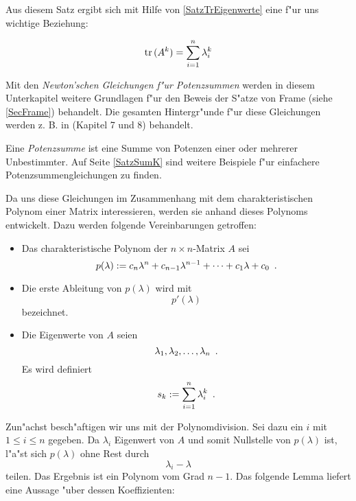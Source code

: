 Aus diesem Satz ergibt sich mit Hilfe von \ref{SatzTrEigenwerte}
eine f"ur uns wichtige Beziehung:
\begin{korollar}
\label{SatzTraceLambda}
    \[ \mbox{\rm tr} \,(A^k) = \sum_{i=1}^n \lambda_i^k \]
\end{korollar}


\label{SecNewtonPotenz}

Mit den {\em Newton'schen Gleichungen f"ur Potenzsummen} werden in diesem
Unterkapitel weitere Grundlagen f"ur den Beweis der S"atze von Frame
(siehe \ref{SecFrame}) behandelt. Die gesamten Hintergr"unde f"ur diese
Gleichungen werden z. B. in \cite{Haup52} (Kapitel 7 und 8) behandelt.

Eine {\em Potenzsumme} ist eine Summe von Potenzen einer oder mehrerer
Unbestimmter. Auf Seite \ref{SatzSumK} sind weitere Beispiele f"ur 
einfachere Potenzsummengleichungen zu finden.

Da uns diese Gleichungen im Zusammenhang mit dem charakteristischen
Polynom einer Matrix interessieren, werden sie anhand dieses Polynoms
entwickelt. Dazu werden folgende Vereinbarungen getroffen:
\begin{itemize}
\item
      Das charakteristische Polynom der $n \times n$-Matrix $A$ sei
      \[
         p(\lambda) := c_n \lambda^n + c_{n-1} \lambda^{n-1} + \cdots
                       + c_1 \lambda + c_0 \mbox{\hspace{0.5em}.} 
      \]
\item
      Die erste Ableitung von $p(\lambda)$ wird mit \[ p'(\lambda) \]
      bezeichnet.
\item Die Eigenwerte von $A$ seien
      \[ \lambda_1, \lambda_2, \ldots, \lambda_n \mbox{\hspace{0.5em}.} \]
      Es wird definiert
      \[ s_k := \sum_{i=1}^n \lambda_i^k \mbox{\hspace{0.5em}.} \]
\end{itemize}

Zun"achst besch"aftigen wir uns mit der 
Polynomdivision. 
Sei dazu ein $i$
mit $ 1 \leq i \leq n $ gegeben. Da $\lambda_i$ Eigenwert von $A$ und somit
Nullstelle von $p(\lambda)$ ist, l"a"st sich $p(\lambda)$ ohne Rest durch
\[ \lambda_i - \lambda \] teilen. Das Ergebnis ist ein Polynom vom Grad
$n-1$. Das folgende Lemma liefert eine Aussage "uber dessen
Koeffizienten:

